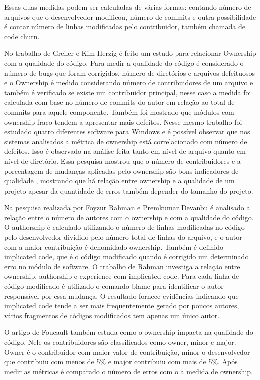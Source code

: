 Essas duas medidas podem ser calculadas de várias formas: contando número de arquivos que o desenvolvedor modificou, número de commits e outra possibilidade é contar número de linhas modificadas pelo contribuidor, também chamada de code churn\cite{Munson:1998:CCM:850947.853326}.

No trabalho de Greiler e Kim Herzig\cite{Greiler} é feito um estudo para relacionar Ownership com a qualidade do código. Para medir a qualidade do código é considerado o número de bugs que foram corrigidos, número de diretórios e arquivos defeituosos e o Ownership é medido considerando número de contribuidores de um arquivo e também é verificado se existe um contribuidor principal, nesse caso a medida foi calculada com base no número de commits do autor em relação ao total de commits para aquele componente. Também foi mostrado que módulos com ownership fraco tendem a apresentar mais defeitos. Nesse mesmo trabalho foi estudado quatro diferentes software para Windows e é possível observar que nos sistemas analisados a métrica de ownership está correlacionado com número de defeitos. Isso é observado na análise feita tanto em nível de arquivo quanto em nível de diretório.  
Essa pesquisa mostrou que o número de contribuidores e a porcentagem de mudanças aplicadas pelo ownership são bons indicadores de qualidade , mostrando que há relação entre ownership e a qualidade de um projeto apesar da quantidade de erros também depender do tamanho do projeto.

Na pesquisa realizada por Foyzur Rahman e Premkumar Devanbu\cite{Rahman2011} é analisado a relação entre o número de autores com o ownership e com a qualidade do código. O authorship é calculado utilizando o número de linhas modificadas no código pelo desenvolvedor dividido pelo número total de linhas do arquivo, e o autor com a maior contribuição é denomidado ownership. Também é definido implicated code, que é o código modificado quando é corrigido um determinado erro no módulo de software. O trabalho de Rahman investiga a relação entre ownership, authorship e experience com implicated code. Para cada linha de código modificado é utilizado o comando blame para identificar o autor responsável por essa mudança. O resultado fornece evidências indicando que implicated code tende a ser mais frequentemente gerado por poucos autores, vários fragmentos de códigos modificados tem apenas um único autor.

O artigo de Foucault\cite{Foucault2015} também estuda como o ownership impacta na qualidade do código. Nele os contribuidores são classificados como owner, minor e major. Owner é o contribuidor com maior valor de contribuição, minor o desenvolvedor que contribuiu com menos de 5\% e major contribuiu com mais de 5\%. Após medir as métricas é comparado o número de erros com o a medida de ownership.

